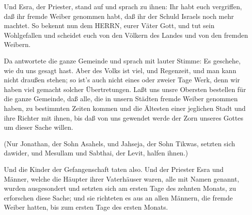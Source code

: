  Und Esra, der Priester, stand auf und sprach zu ihnen: Ihr
habt euch vergriffen, daß ihr fremde Weiber genommen habt, daß ihr der
Schuld Israels noch mehr machtet.  So bekennt nun dem
HERRN, eurer Väter Gott, und tut sein Wohlgefallen und scheidet euch von
den Völkern des Landes und von den fremden Weibern.

 Da antwortete die ganze Gemeinde und sprach mit lauter
Stimme: Es geschehe, wie du uns gesagt hast.  Aber des
Volks ist viel, und Regenzeit, und man kann nicht draußen stehen; so
ist's auch nicht eines oder zweier Tage Werk, denn wir haben viel
gemacht solcher Übertretungen.  Laßt uns unsre Obersten
bestellen für die ganze Gemeinde, daß alle, die in unsern Städten fremde
Weiber genommen haben, zu bestimmten Zeiten kommen und die Ältesten
einer jeglichen Stadt und ihre Richter mit ihnen, bis daß von uns
gewendet werde der Zorn unseres Gottes um dieser Sache willen.

 (Nur Jonathan, der Sohn Asahels, und Jahseja, der Sohn
Tikwas, setzten sich dawider, und Mesullam und Sabthai, der Levit,
halfen ihnen.)

 Und die Kinder der Gefangenschaft taten also. Und der
Priester Esra und Männer, welche die Häupter ihrer Vaterhäuser waren,
alle mit Namen genannt, wurden ausgesondert und setzten sich am ersten
Tage des zehnten Monats, zu erforschen diese Sache;  und
sie richteten es aus an allen Männern, die fremde Weiber hatten, bis zum
ersten Tage des ersten Monats.

